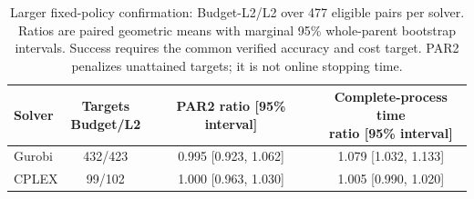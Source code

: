 \begin{table}[htbp]
\centering\small\setlength{\tabcolsep}{4pt}
\caption{Larger fixed-policy confirmation: Budget-L2/L2 over 477 eligible pairs
per solver. Ratios are paired geometric means with marginal 95\% whole-parent
bootstrap intervals. Success requires the common verified accuracy and cost
target. PAR2 penalizes unattained targets; it is not online stopping time.}
\label{tab:orf-large-confirmation}
\begin{tabular}{lccc}\toprule
Solver & \shortstack{Targets\\Budget/L2} & PAR2 ratio [95\% interval] & \shortstack{Complete-process time\\ratio [95\% interval]}\\\midrule
Gurobi & 432/423 & 0.995 [0.923, 1.062] & 1.079 [1.032, 1.133]\\
CPLEX & 99/102 & 1.000 [0.963, 1.030] & 1.005 [0.990, 1.020]\\
\bottomrule\end{tabular}\end{table}
